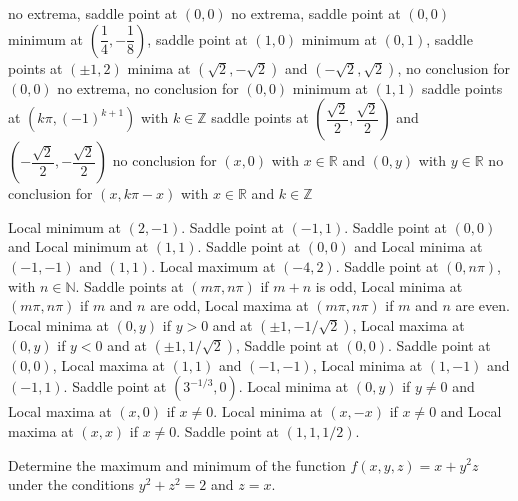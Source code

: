 \begin{Answer}
    \begin{multicols}{2}
    
    \Question no extrema, saddle point at $(0,0)$
    \Question no extrema, saddle point at $(0,0)$
    \Question minimum at $\left(\dfrac{1}{4},-\dfrac{1}{8}\right)$, saddle point at $(1,0)$
    \Question minimum at $(0,1)$, saddle points at $(\pm 1, 2)$
    \Question minima at $\left(\sqrt{2},-\sqrt{2}\right)$ and $\left(-\sqrt{2},\sqrt{2}\right)$, no conclusion for $(0,0)$
    \Question no extrema, no conclusion for $(0,0)$
    \Question minimum at $(1,1)$
    \Question saddle points at $\left(k \pi, (-1)^{k+1} \right)$ with $k \in \mathbb{Z}$ 
    \Question saddle points at $\left(\dfrac{\sqrt{2}}{2},\dfrac{\sqrt{2}}{2}\right)$ and $\left(-\dfrac{\sqrt{2}}{2},-\dfrac{\sqrt{2}}{2}\right)$  
    \Question no conclusion for $(x,0)$ with $x \in \mathbb{R}$ and $(0,y)$ with $y \in \mathbb{R}$
    \Question no conclusion for $(x,k \pi - x)$ with $x \in \mathbb{R}$ and $k \in \mathbb{Z}$ 
    
    
    
    \Question Local minimum at $(2,-1)$.
    \Question Saddle point at $(-1,1)$.
    \Question Saddle point at $(0,0)$ and Local minimum at $(1,1)$.
    \Question Saddle point at $(0,0)$ and Local minima at $(-1,-1)$ and $(1,1)$.
    \Question Local maximum at $(-4,2)$.
    \Question Saddle point at $(0,n\pi)$, with $n\in\mathbb{N}$.
    \Question Saddle points at $(m\pi, n\pi)$ if $m + n$ is odd, Local minima at $(m\pi, n\pi)$ if $m$ and $n$ are odd, Local maxima at $(m\pi, n\pi)$ if $m$ and $n$ are even.
    \Question Local minima at $(0,y)$ if $y>0$ and at $\left(\pm 1, -1/\sqrt{2}\right)$, Local maxima at $(0,y)$ if $y<0$ and at $\left(\pm 1, 1/\sqrt{2}\right)$, Saddle point at $(0,0)$. 
    \Question Saddle point at $(0,0)$, Local maxima at $(1, 1)$ and $(-1,-1)$, Local minima at $(1,-1)$ and $(-1,1)$. 
    \Question Saddle point at $(3^{-1/3},0)$.
    \Question Local minima at $(0,y)$ if $y\neq 0$ and Local maxima at $(x,0)$ if $x\neq 0$.
    \Question Local minima at $(x,-x)$ if $x\neq 0$ and Local maxima at $(x,x)$ if $x\neq 0$.
    \Question Saddle point at $\left(1,1, 1/2\right)$.
    
    \EndCurrentQuestion
    \end{multicols}
\end{Answer}

\begin{Exercise}[difficulty = 1] Determine the maximum and minimum of the function $f(x,y,z)=x+y^2z$ under the conditions $y^2+z^2=2$ and $z=x$.
\end{Exercise}

